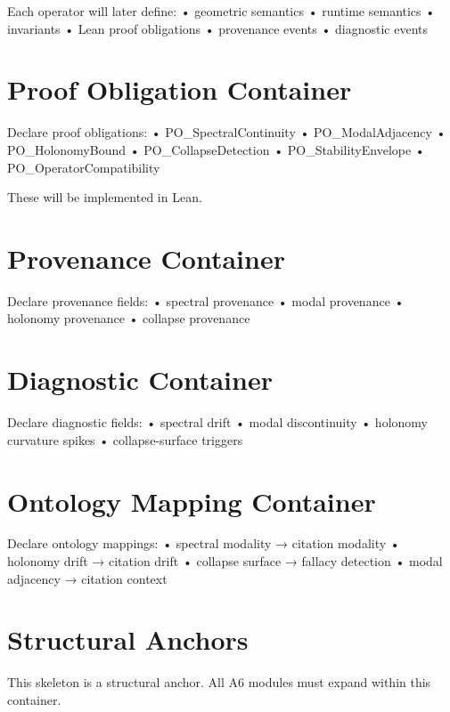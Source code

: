 \documentclass[11pt]{article}
\begin{document}
Each operator will later define:
  • geometric semantics  
  • runtime semantics  
  • invariants  
  • Lean proof obligations  
  • provenance events  
  • diagnostic events  

\section{Proof Obligation Container}

Declare proof obligations:
  • PO\_SpectralContinuity  
  • PO\_ModalAdjacency  
  • PO\_HolonomyBound  
  • PO\_CollapseDetection  
  • PO\_StabilityEnvelope  
  • PO\_OperatorCompatibility  

These will be implemented in Lean.

\section{Provenance Container}

Declare provenance fields:
  • spectral provenance  
  • modal provenance  
  • holonomy provenance  
  • collapse provenance  

\section{Diagnostic Container}

Declare diagnostic fields:
  • spectral drift  
  • modal discontinuity  
  • holonomy curvature spikes  
  • collapse-surface triggers  

\section{Ontology Mapping Container}

Declare ontology mappings:
  • spectral modality → citation modality  
  • holonomy drift → citation drift  
  • collapse surface → fallacy detection  
  • modal adjacency → citation context  

\section{Structural Anchors}

This skeleton is a structural anchor.
All A6 modules must expand within this container.
\end{document}
